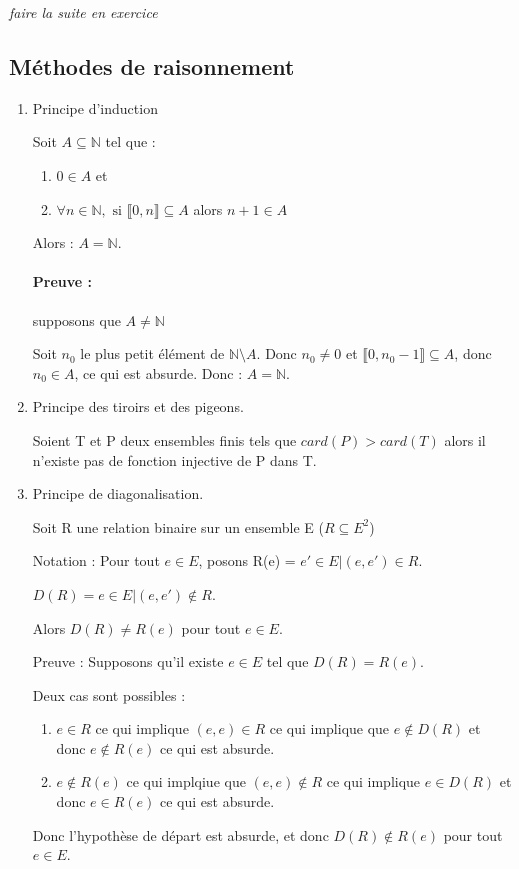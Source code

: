 \documentclass[12pt, a4paper]{report}
\begin{document}
\begin{center}
\textit{faire la suite en exercice}
\end{center}

\subsection{Méthodes de raisonnement}
\begin{enumerate}
\item Principe d'induction

Soit $A\subseteq \mathbb{N}$ tel que :
\begin{enumerate}
\item $0\in A$ et
\item $\forall n \in \mathbb{N}, \text{ si } \llbracket 0,n\rrbracket
\subseteq A$ alors $n+1\in A$
\end{enumerate}
Alors : $A=\mathbb{N}$.
\paragraph{Preuve :} supposons que $A\neq \mathbb{N}$

Soit $n_0$ le plus petit élément de $\mathbb{N}\setminus A$.
Donc $n_0\neq 0$ et $\llbracket 0,n_0-1\rrbracket \subseteq A$, donc $n_0\in A$,
ce qui est absurde. Donc : $A=\mathbb{N}$.







\item Principe des tiroirs et des pigeons. 

Soient T et P deux ensembles finis tels que $card(P) > card(T)$  alors il
n'existe pas de fonction injective de P dans T.


\item Principe de diagonalisation.

Soit R une relation binaire sur un ensemble E ($R \subseteq E^2$)

Notation : Pour tout $e \in E$, posons R(e) = ${e' \in E | (e, e') \in R}$.

$D(R) = {e \in E | (e, e') \not\in R}$.

Alors $D(R) \neq R(e)$ pour tout $e\in E$.

Preuve : Supposons qu'il existe $e \in E$ tel que $ D(R) = R(e)$.

Deux cas sont possibles :
\begin{enumerate}
\item $e \in R$ ce qui implique $(e, e) \in R$ ce qui implique que $e \not\in 
D(R)$ et donc $e \not\in R(e)$ ce qui est absurde.

\item $e \not\in R(e)$ ce qui implqiue que $(e,e) \not\in R$ ce qui implique $e
\in D(R)$ et donc $e \in R(e)$ ce qui est absurde.

\end{enumerate}

Donc l'hypothèse de départ est absurde, et donc $D(R) \not\in R(e)$ pour tout $e
\in E$.
\end{enumerate}
\end{document}
